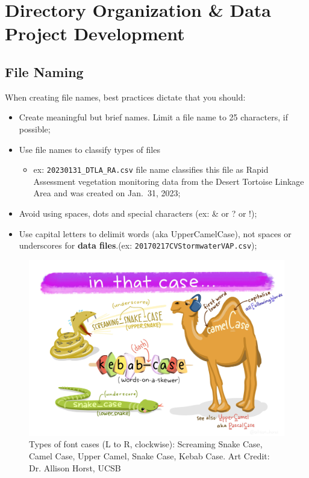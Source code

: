 \documentclass[
]{book}
\providecommand{\tightlist}{%
  \setlength{\itemsep}{0pt}\setlength{\parskip}{0pt}}
\begin{document}
\hypertarget{organization}{%
\chapter{Directory Organization \& Data Project Development}\label{organization}}

\hypertarget{file-naming}{%
\section{File Naming}\label{file-naming}}

When creating file names, best practices dictate that you should:

\begin{itemize}
\tightlist
\item
  Create meaningful but brief names. Limit a file name to 25 characters, if possible;
\item
  Use file names to classify types of files

  \begin{itemize}
  \tightlist
  \item
    ex: \texttt{20230131\_DTLA\_RA.csv} file name classifies this file as Rapid Assessment vegetation monitoring data from the Desert Tortoise Linkage Area and was created on Jan.~31, 2023;
  \end{itemize}
\item
  Avoid using spaces, dots and special characters (ex: \& or ? or !);
\item
  Use capital letters to delimit words (aka UpperCamelCase), not spaces or underscores for \textbf{data files}.(ex: \texttt{20170217CVStormwaterVAP.csv});
\end{itemize}

\begin{figure}

{\centering \includegraphics[width=0.75\linewidth]{images/case_horst} 

}

\caption{Types of font cases (L to R, clockwise): Screaming Snake Case, Camel Case, Upper Camel, Snake Case, Kebab Case. Art Credit: Dr. Allison Horst, UCSB}\label{fig:case}
\end{figure}
\end{document}
